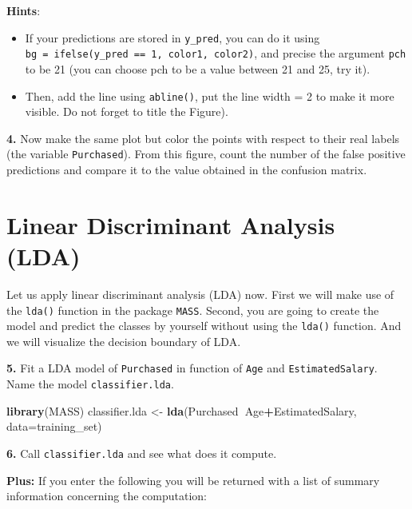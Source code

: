 \documentclass[]{book}
\newenvironment{Shaded}{\begin{snugshade}}{\end{snugshade}}
\newcommand{\KeywordTok}[1]{\textcolor[rgb]{0.13,0.29,0.53}{\textbf{#1}}}
\newcommand{\DataTypeTok}[1]{\textcolor[rgb]{0.13,0.29,0.53}{#1}}
\newcommand{\StringTok}[1]{\textcolor[rgb]{0.31,0.60,0.02}{#1}}
\newcommand{\OperatorTok}[1]{\textcolor[rgb]{0.81,0.36,0.00}{\textbf{#1}}}
\newcommand{\NormalTok}[1]{#1}
\providecommand{\tightlist}{%
  \setlength{\itemsep}{0pt}\setlength{\parskip}{0pt}}
\begin{document}
\textbf{Hints}:

\begin{itemize}
\tightlist
\item
  If your predictions are stored in \texttt{y\_pred}, you can do it
  using
  \texttt{bg\ =\ ifelse(y\_pred\ ==\ 1,\ \textquotesingle{}color1\textquotesingle{},\ \textquotesingle{}color2\textquotesingle{})},
  and precise the argument \texttt{pch} to be 21 (you can choose pch to
  be a value between 21 and 25, try it).
\item
  Then, add the line using \texttt{abline()}, put the line width = 2 to
  make it more visible. Do not forget to title the Figure).
\end{itemize}

\textbf{4.} Now make the same plot but color the points with respect to
their real labels (the variable \texttt{Purchased}). From this figure,
count the number of the false positive predictions and compare it to the
value obtained in the confusion matrix.

\section*{Linear Discriminant Analysis
(LDA)}\label{linear-discriminant-analysis-lda}

Let us apply linear discriminant analysis (LDA) now. First we will make
use of the \texttt{lda()} function in the package \texttt{MASS}. Second,
you are going to create the model and predict the classes by yourself
without using the \texttt{lda()} function. And we will visualize the
decision boundary of LDA.

\textbf{5.} Fit a LDA model of \texttt{Purchased} in function of
\texttt{Age} and \texttt{EstimatedSalary}. Name the model
\texttt{classifier.lda}.

\begin{Shaded}
\begin{Highlighting}[]
\KeywordTok{library}\NormalTok{(MASS)}
\NormalTok{classifier.lda <-}\StringTok{ }\KeywordTok{lda}\NormalTok{(Purchased}\OperatorTok{~}\NormalTok{Age}\OperatorTok{+}\NormalTok{EstimatedSalary, }\DataTypeTok{data=}\NormalTok{training_set)}
\end{Highlighting}
\end{Shaded}

\textbf{6.} Call \texttt{classifier.lda} and see what does it compute.

\textbf{Plus:} If you enter the following you will be returned with a
list of summary information concerning the computation:
\end{document}
